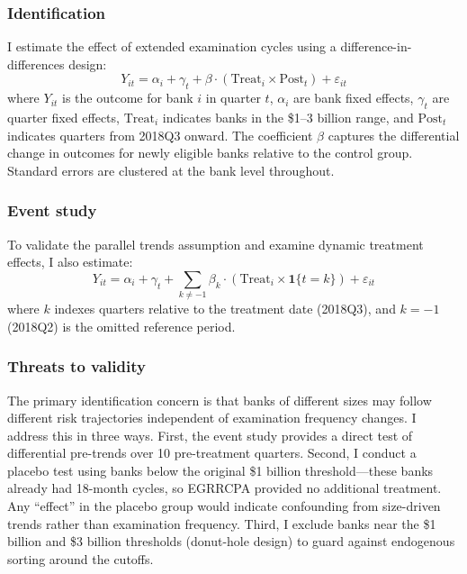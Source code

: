\documentclass[12pt]{article}
\begin{document}
\subsubsection*{Identification} I estimate the effect of extended examination cycles using a difference-in-differences design:
\begin{equation}
Y_{it} = \alpha_i + \gamma_t + \beta \cdot (\text{Treat}_i \times \text{Post}_t) + \varepsilon_{it}
\label{eq:did}
\end{equation}
where $Y_{it}$ is the outcome for bank $i$ in quarter $t$, $\alpha_i$ are bank fixed effects, $\gamma_t$ are quarter fixed effects, $\text{Treat}_i$ indicates banks in the \$1--3 billion range, and $\text{Post}_t$ indicates quarters from 2018Q3 onward. The coefficient $\beta$ captures the differential change in outcomes for newly eligible banks relative to the control group. Standard errors are clustered at the bank level throughout.

\subsubsection*{Event study} To validate the parallel trends assumption and examine dynamic treatment effects, I also estimate:
\begin{equation}
Y_{it} = \alpha_i + \gamma_t + \sum_{k \neq -1} \beta_k \cdot (\text{Treat}_i \times \mathbf{1}\{t = k\}) + \varepsilon_{it}
\label{eq:es}
\end{equation}
where $k$ indexes quarters relative to the treatment date (2018Q3), and $k = -1$ (2018Q2) is the omitted reference period.

\subsubsection*{Threats to validity} The primary identification concern is that banks of different sizes may follow different risk trajectories independent of examination frequency changes. I address this in three ways. First, the event study provides a direct test of differential pre-trends over 10 pre-treatment quarters. Second, I conduct a placebo test using banks below the original \$1 billion threshold---these banks already had 18-month cycles, so EGRRCPA provided no additional treatment. Any ``effect'' in the placebo group would indicate confounding from size-driven trends rather than examination frequency. Third, I exclude banks near the \$1 billion and \$3 billion thresholds (donut-hole design) to guard against endogenous sorting around the cutoffs.
\end{document}
